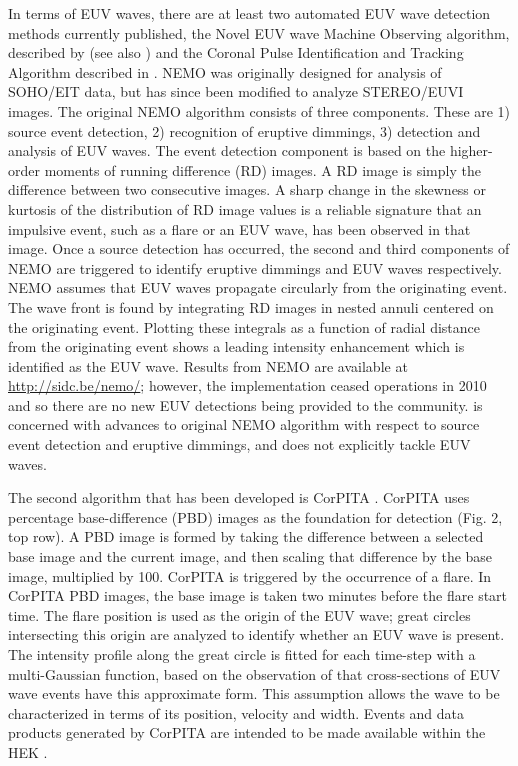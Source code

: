 In terms of EUV waves, there are at least two automated EUV wave
detection methods currently published, the Novel EUV wave Machine
Observing algorithm, described by \cite{2005SoPh..228..265P} (see also
\cite{2012SoPh..276..479P}) and the Coronal Pulse Identification and
Tracking Algorithm described in \cite{2014SoPh..289.3279L}. NEMO was
originally designed for analysis of SOHO/EIT data, but has since been
modified to analyze STEREO/EUVI images. The original NEMO algorithm
\cite{2005SoPh..228..265P} consists of three components. These are 1)
source event detection, 2) recognition of eruptive dimmings, 3)
detection and analysis of EUV waves. The event detection component is
based on the higher-order moments of running difference (RD) images. A
RD image is simply the difference between two consecutive images. A
sharp change in the skewness or kurtosis of the distribution of RD
image values is a reliable signature that an impulsive event, such as
a flare or an EUV wave, has been observed in that image. Once a source
detection has occurred, the second and third components of NEMO are
triggered to identify eruptive dimmings and EUV waves respectively.
NEMO assumes that EUV waves propagate circularly from the originating
event. The wave front is found by integrating RD images in nested
annuli centered on the originating event.  Plotting these integrals as
a function of radial distance from the originating event shows a
leading intensity enhancement which is identified as the EUV wave.
Results from NEMO are available at \url{http://sidc.be/nemo/};
however, the implementation ceased operations in 2010 and so there are
no new EUV detections being provided to the community.
\cite{2012SoPh..276..479P} is concerned with advances to original NEMO
algorithm with respect to source event detection and eruptive
dimmings, and does not explicitly tackle EUV waves.

The second algorithm that has been developed is CorPITA
\citep{2014SoPh..289.3279L}. CorPITA uses percentage base-difference
(PBD) images as the foundation for detection (Fig. 2, top row).  A PBD
image is formed by taking the difference between a selected base image
and the current image, and then scaling that difference by the base
image, multiplied by 100.  CorPITA is triggered by the occurrence of a
flare.  In CorPITA PBD images, the base image is taken two minutes
before the flare start time. The flare position is used as the origin
of the EUV wave; great circles intersecting this origin are analyzed
to identify whether an EUV wave is present. The intensity profile
along the great circle is fitted for each time-step with a
multi-Gaussian function, based on the observation of
\cite{2006ApJ...645..757W} that cross-sections of EUV wave events have
this approximate form. This assumption allows the wave to be
characterized in terms of its position, velocity and width. Events and
data products generated by CorPITA are intended to be made available
within the HEK \citep{hek2012, 2012SoPh..275...79M}.  

